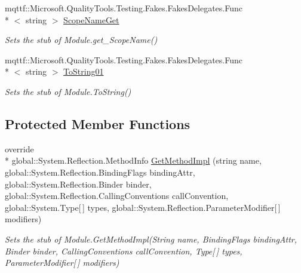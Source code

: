 \begin{DoxyCompactItemize}
mqttf\-::\-Microsoft.\-Quality\-Tools.\-Testing.\-Fakes.\-Fakes\-Delegates.\-Func\\*
$<$ string $>$ \hyperlink{class_system_1_1_reflection_1_1_fakes_1_1_stub_module_a2a138245c32068da08d5481efe3f6366}{Scope\-Name\-Get}
\begin{DoxyCompactList}\small\item\em Sets the stub of Module.\-get\-\_\-\-Scope\-Name()\end{DoxyCompactList}\item 
mqttf\-::\-Microsoft.\-Quality\-Tools.\-Testing.\-Fakes.\-Fakes\-Delegates.\-Func\\*
$<$ string $>$ \hyperlink{class_system_1_1_reflection_1_1_fakes_1_1_stub_module_a76ad7b085ff6976b91407939e4b616e5}{To\-String01}
\begin{DoxyCompactList}\small\item\em Sets the stub of Module.\-To\-String()\end{DoxyCompactList}\end{DoxyCompactItemize}
\subsection*{Protected Member Functions}
\begin{DoxyCompactItemize}
\item 
override \\*
global\-::\-System.\-Reflection.\-Method\-Info \hyperlink{class_system_1_1_reflection_1_1_fakes_1_1_stub_module_ae38dde1e2b9eb605d5d0311125402f77}{Get\-Method\-Impl} (string name, global\-::\-System.\-Reflection.\-Binding\-Flags binding\-Attr, global\-::\-System.\-Reflection.\-Binder binder, global\-::\-System.\-Reflection.\-Calling\-Conventions call\-Convention, global\-::\-System.\-Type\mbox{[}$\,$\mbox{]} types, global\-::\-System.\-Reflection.\-Parameter\-Modifier\mbox{[}$\,$\mbox{]} modifiers)
\begin{DoxyCompactList}\small\item\em Sets the stub of Module.\-Get\-Method\-Impl(\-String name, Binding\-Flags binding\-Attr, Binder binder, Calling\-Conventions call\-Convention, Type\mbox{[}$\,$\mbox{]} types, Parameter\-Modifier\mbox{[}$\,$\mbox{]} modifiers)\end{DoxyCompactList}\end{DoxyCompactItemize}

